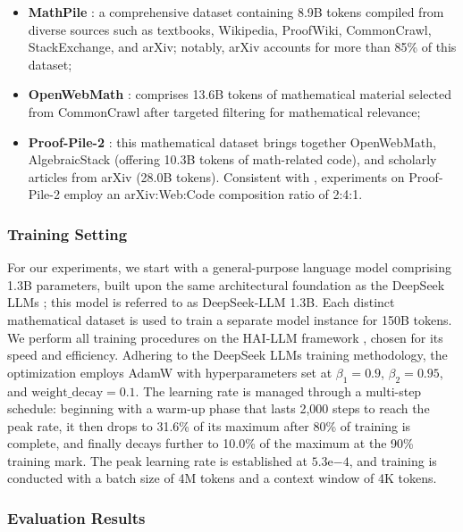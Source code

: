 \begin{itemize}[topsep=0pt]
\begin{itemize}[topsep=0pt]
    \item \textbf{MathPile} \citep{mathpile}: a comprehensive dataset containing 8.9B tokens compiled from diverse sources such as textbooks, Wikipedia, ProofWiki, CommonCrawl, StackExchange, and arXiv; notably, arXiv accounts for more than 85\% of this dataset;
    \item \textbf{OpenWebMath} \citep{openwebmath}: comprises 13.6B tokens of mathematical material selected from CommonCrawl after targeted filtering for mathematical relevance;
    \item \textbf{Proof-Pile-2} \citep{llemma}: this mathematical dataset brings together OpenWebMath, AlgebraicStack (offering 10.3B tokens of math-related code), and scholarly articles from arXiv (28.0B tokens). Consistent with \cite{llemma}, experiments on Proof-Pile-2 employ an arXiv:Web:Code composition ratio of 2:4:1.
\end{itemize}

\subsubsection{Training Setting}
\label{sec:quality-policy}
For our experiments, we start with a general-purpose language model comprising 1.3B parameters, built upon the same architectural foundation as the DeepSeek LLMs \citep{deepseek-llm}; this model is referred to as DeepSeek-LLM 1.3B. Each distinct mathematical dataset is used to train a separate model instance for 150B tokens. We perform all training procedures on the HAI-LLM framework \citep{haillm}, chosen for its speed and efficiency. Adhering to the DeepSeek LLMs training methodology, the optimization employs AdamW \citep{adamW} with hyperparameters set at $\beta_1=0.9$, $\beta_2=0.95$, and $\mathrm{weight\_decay}=0.1$. The learning rate is managed through a multi-step schedule: beginning with a warm-up phase that lasts 2,000 steps to reach the peak rate, it then drops to 31.6\% of its maximum after 80\% of training is complete, and finally decays further to 10.0\% of the maximum at the 90\% training mark. The peak learning rate is established at $5.3\mathrm{e}{-4}$, and training is conducted with a batch size of 4M tokens and a context window of 4K tokens.

\subsubsection{Evaluation Results}


\end{itemize}
